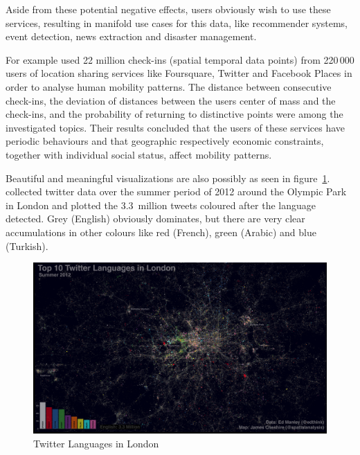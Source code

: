 Aside from these potential negative effects, users obviously wish to use these services, resulting in manifold use cases for this data, like recommender systems, event detection, news extraction and disaster management.

For example \textcite{Cheng2011} used 22 million check-ins (spatial temporal data points) from 220\,000 users of location sharing services like Foursquare, Twitter and Facebook Places in order to analyse human mobility patterns. The distance between consecutive check-ins, the deviation of distances between the users center of mass and the check-ins, and the probability of returning to distinctive points were among the investigated topics. Their results concluded that the users of these services have periodic behaviours and that geographic respectively economic constraints, together with individual social status, affect mobility patterns.

Beautiful and meaningful visualizations are also possibly as seen in figure~\ref{fig:twitter_london}. \textcite{Cheshire2012} collected twitter data over the summer period of 2012 around the Olympic Park in London and plotted the 3.3~million tweets coloured after the language detected. Grey (English) obviously dominates, but there are very clear accumulations in other colours like red (French), green (Arabic) and blue (Turkish).

\begin{figure}%
\centering
\includegraphics[width=\textwidth]{pix/twitter_lang_london.png}
\caption[Twitter Languages in London]{Twitter Languages in London\cite{Cheshire2012}}
\label{fig:twitter_london}
\end{figure}

